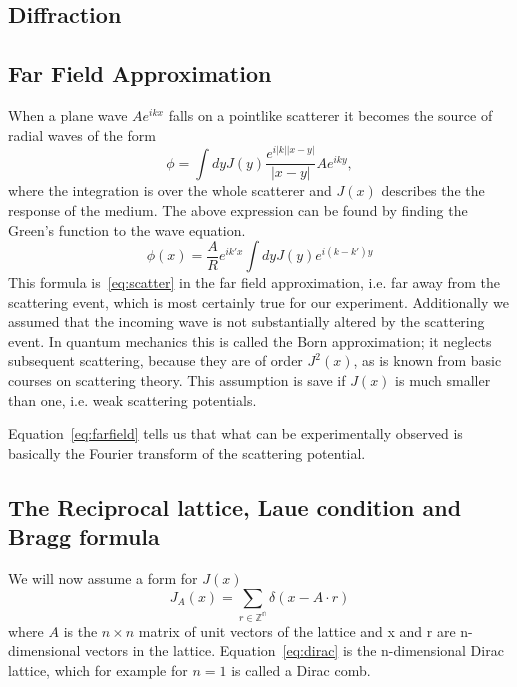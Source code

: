 \documentclass[a4paper,10pt]{scrartcl}
\begin{document}
\subsection{Diffraction}

\subsection{Far Field Approximation}

When a plane wave $Ae^{ikx}$ falls on a pointlike scatterer it becomes the source of radial waves of the form
\begin{equation}
\phi=\int dy J(y)\frac{e^{i|k||x-y|}}{|x-y|} A e^{iky}, \label{eq:scatter}
\end{equation}
where the integration is over the whole scatterer and $J(x)$ describes the the response of the medium. The above expression can be found by finding the Green's function to the wave equation.
\begin{equation}
\phi(x)=\frac{A}{R}e^{ik'x}\int dyJ(y)e^{i(k-k')y}  \label{eq:farfield}
\end{equation}
This formula is~\eqref{eq:scatter} in the far field approximation, i.e. far away from the scattering event, which is most certainly true for our experiment. Additionally we assumed that the incoming wave is not substantially altered by the scattering event. In quantum mechanics this is called the Born approximation; it neglects subsequent scattering, because they are of order $J^{2}(x)$, as is known from basic courses on scattering theory. This assumption is save if $J(x)$ is much smaller than one, i.e. weak scattering potentials.

Equation~\eqref{eq:farfield} tells us that what can be experimentally observed is basically the Fourier transform of the scattering potential. 

\subsection{The Reciprocal lattice, Laue condition and Bragg formula}

We will now assume a form for $J(x)$
\begin{equation}
J_{A}(x)=\sum_{r\in\mathbb{\mathbb{Z^{n}}}}\delta(x-A\cdot r) \label{eq:dirac}
\end{equation} 
where $A$ is the $n \times n$ matrix of unit vectors of the lattice and x and r are n-dimensional vectors in the lattice. Equation~\eqref{eq:dirac} is the n-dimensional Dirac lattice, which for example for $n=1$ is called a Dirac comb. 
\end{document}
